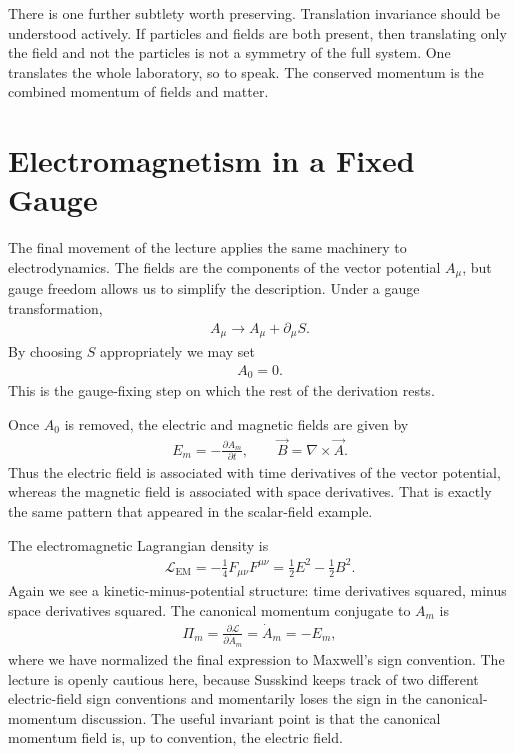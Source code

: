 There is one further subtlety worth preserving. Translation invariance should be understood actively. If particles and fields are both present, then translating only the field and not the particles is not a symmetry of the full system. One translates the whole laboratory, so to speak. The conserved momentum is the combined momentum of fields and matter.

\section{Electromagnetism in a Fixed Gauge}

The final movement of the lecture applies the same machinery to electrodynamics. The fields are the components of the vector potential \(A_\mu\), but gauge freedom allows us to simplify the description. Under a gauge transformation,
\begin{align}
A_\mu \to A_\mu+\partial_\mu S.
\end{align}
By choosing \(S\) appropriately we may set
\begin{align}
A_0=0.
\end{align}
This is the gauge-fixing step on which the rest of the derivation rests.

Once \(A_0\) is removed, the electric and magnetic fields are given by
\begin{align}
E_m=-\frac{\partial A_m}{\partial t},
\qquad
\vec B=\nabla\times \vec A.
\end{align}
Thus the electric field is associated with time derivatives of the vector potential, whereas the magnetic field is associated with space derivatives. That is exactly the same pattern that appeared in the scalar-field example.

The electromagnetic Lagrangian density is
\begin{align}
\mathcal L_{\mathrm{EM}}
=-\frac14F_{\mu\nu}F^{\mu\nu}
=\frac12E^2-\frac12B^2.
\end{align}
Again we see a kinetic-minus-potential structure: time derivatives squared, minus space derivatives squared. The canonical momentum conjugate to \(A_m\) is
\begin{align}
\Pi_m=\frac{\partial \mathcal L}{\partial \dot A_m}=\dot A_m=-E_m,
\end{align}
where we have normalized the final expression to Maxwell's sign convention. The lecture is openly cautious here, because Susskind keeps track of two different electric-field sign conventions and momentarily loses the sign in the canonical-momentum discussion. The useful invariant point is that the canonical momentum field is, up to convention, the electric field.

